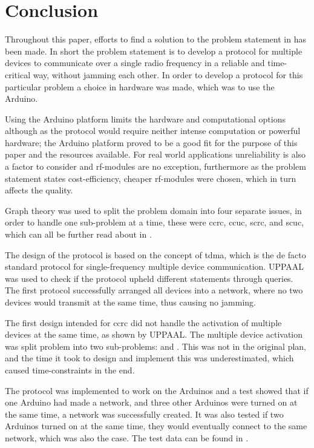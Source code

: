 \chapter{Conclusion}\label{cha:conclusion}
Throughout this paper, efforts to find a solution to the problem statement in  has been made.
In short the problem statement is to develop a protocol for multiple devices to communicate over a single radio frequency in a reliable and time-critical way, without jamming each other.
In order to develop a protocol for this particular problem a choice in hardware was made, which was to use the Arduino.

Using the Arduino platform limits the hardware and computational options although as the protocol would require neither intense computation or powerful hardware; the Arduino platform proved to be a good fit for the purpose of this paper and the resources available.
For real world applications unreliability is also a factor to consider and \gls{rf}-modules are no exception, furthermore as the problem statement states cost-efficiency, cheaper \gls{rf}-modules were chosen, which in turn affects the quality.

\bigskip \noindent
Graph theory was used to split the problem domain into four separate issues, in order to handle one sub-problem at a time, these were \acrfull{ccrc}, \acrfull{ccuc}, \acrfull{scrc}, and \acrfull{scuc}, which can all be further read about in .

The design of the protocol is based on the concept of \acrfull{tdma}, which is the de facto standard protocol for single-frequency multiple device communication.
UPPAAL was used to check if the protocol upheld different statements through queries.
The first protocol successfully arranged all devices into a network, where no two devices would transmit at the same time, thus causing no jamming.

The first design intended for \acrshort{ccrc} did not handle the activation of multiple devices at the same time, as shown by UPPAAL.
The multiple device activation was split problem into two sub-problems:  and .
This was not in the original plan, and the time it took to design and implement this was underestimated, which caused time-constraints in the end.

The protocol was implemented to work on the Arduinos and a test showed that if one Arduino had made a network, and three other Arduinos were turned on at the same time, a network was successfully created.
It was also tested if two Arduinos turned on at the same time, they would eventually connect to the same network, which was also the case.
The test data can be found in .

